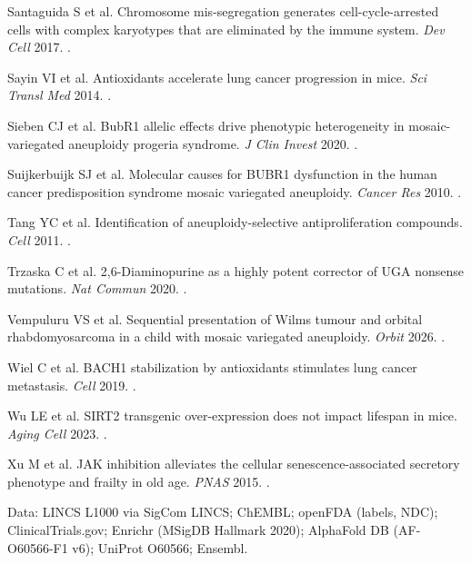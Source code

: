 \documentclass[10pt]{article}
\begin{document}
\begin{refs}
\item Santaguida S et al. Chromosome mis-segregation generates cell-cycle-arrested cells with complex karyotypes that are eliminated by the immune system. \textit{Dev Cell} 2017. .
\item Sayin VI et al. Antioxidants accelerate lung cancer progression in mice. \textit{Sci Transl Med} 2014. .
\item Sieben CJ et al. BubR1 allelic effects drive phenotypic heterogeneity in mosaic-variegated aneuploidy progeria syndrome. \textit{J Clin Invest} 2020. .
\item Suijkerbuijk SJ et al. Molecular causes for BUBR1 dysfunction in the human cancer predisposition syndrome mosaic variegated aneuploidy. \textit{Cancer Res} 2010. .
\item Tang YC et al. Identification of aneuploidy-selective antiproliferation compounds. \textit{Cell} 2011. .
\item Trzaska C et al. 2,6-Diaminopurine as a highly potent corrector of UGA nonsense mutations. \textit{Nat Commun} 2020. .
\item Vempuluru VS et al. Sequential presentation of Wilms tumour and orbital rhabdomyosarcoma in a child with mosaic variegated aneuploidy. \textit{Orbit} 2026. .
\item Wiel C et al. BACH1 stabilization by antioxidants stimulates lung cancer metastasis. \textit{Cell} 2019. .
\item Wu LE et al. SIRT2 transgenic over-expression does not impact lifespan in mice. \textit{Aging Cell} 2023. .
\item Xu M et al. JAK inhibition alleviates the cellular senescence-associated secretory phenotype and frailty in old age. \textit{PNAS} 2015. .
\item Data: LINCS L1000 via SigCom LINCS; ChEMBL; openFDA (labels, NDC); ClinicalTrials.gov; Enrichr (MSigDB Hallmark 2020); AlphaFold DB (AF-O60566-F1 v6); UniProt O60566; Ensembl.
\end{refs}

\clearpage
\appendix

\end{document}
